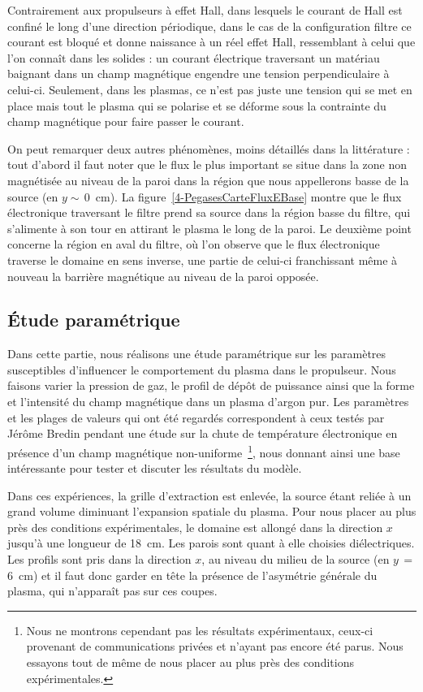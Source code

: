\begin{refsection}
Contrairement aux propulseurs à
effet Hall, dans lesquels le courant de Hall est confiné le long d'une
direction périodique, dans le cas de
la configuration filtre ce courant est bloqué et donne naissance à un réel effet 
Hall, ressemblant à celui que l'on connaît dans les solides : un courant
électrique traversant un matériau baignant dans un champ magnétique engendre une tension
perpendiculaire à celui-ci. Seulement, dans les plasmas, ce n'est pas juste une
tension qui se met en place mais tout le plasma qui se polarise et se déforme
sous la contrainte du champ magnétique pour faire passer le courant.

On peut remarquer
deux autres phénomènes, moins détaillés dans la littérature : tout d'abord il
faut noter que le flux le plus important se situe dans la zone non magnétisée au
niveau de la paroi dans la région que nous appellerons basse de la source (en
$y\sim\,$0~cm).
La figure~\ref{4-PegasesCarteFluxEBase} montre que le flux électronique
traversant le filtre prend sa source dans la région basse du filtre, qui
s'alimente à son tour en attirant le plasma le long de la paroi.
Le deuxième point concerne la région en aval du filtre, où l'on observe que le
flux électronique traverse le domaine en sens inverse, une partie de celui-ci franchissant même à nouveau
la barrière magnétique au niveau de la paroi opposée.

\subsection{Étude paramétrique}
Dans cette partie, nous
réalisons une étude paramétrique sur les paramètres susceptibles
d'influencer le comportement du plasma dans le propulseur. Nous faisons varier
la pression de gaz, le profil de dépôt de puissance ainsi que la forme et
l'intensité du champ magnétique dans un plasma d'argon pur. Les paramètres et
les plages de valeurs qui ont été regardés correspondent à ceux testés par
Jérôme Bredin pendant une étude sur la chute de température électronique en
présence d'un champ magnétique non-uniforme~\parencite{Bredin}\footnote{Nous ne
montrons cependant pas les résultats expérimentaux, ceux-ci provenant de
communications privées et n'ayant pas encore été parus. Nous essayons tout de
même de nous placer au plus près des conditions expérimentales.}, nous donnant
ainsi une base intéressante pour tester et discuter les résultats du modèle.

Dans ces expériences, la
grille d'extraction est enlevée, la source étant reliée à un grand volume
diminuant l'expansion spatiale du plasma. Pour nous placer au plus près des
conditions expérimentales, le domaine est allongé dans
la direction $x$ jusqu'à une longueur de 18~cm. Les parois sont quant à elle
choisies diélectriques. Les profils sont pris dans la direction $x$, au niveau
du milieu de la source (en $y\,=$ 6~cm) et il faut donc garder en tête la
présence de l'asymétrie générale du plasma, qui n'apparaît pas sur ces coupes.
	

\end{refsection}
